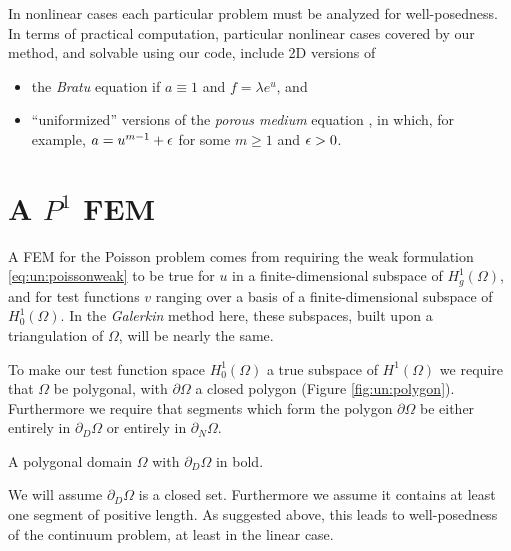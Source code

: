 In nonlinear cases each particular problem must be analyzed for well-posedness.  In terms of practical computation, particular nonlinear cases covered by our method, and solvable using our code, include 2D versions of
\begin{itemize}
\item the \emph{Bratu} equation if $a\equiv 1$ and $f=\lambda e^u$, and
\item ``uniformized'' versions of the \emph{porous medium} equation \citep{Ockendonetal2003}, in which, for example, $a=u^{m-1}+\epsilon$ for some $m\ge 1$ and $\epsilon>0$.
\end{itemize}


\section{A $P^1$ FEM}

A FEM for the Poisson problem comes from requiring the weak formulation \eqref{eq:un:poissonweak} to be true for $u$ in a finite-dimensional subspace of $H_{g}^1(\Omega)$, and for test functions $v$ ranging over a basis of a finite-dimensional subspace of $H_{0}^1(\Omega)$.  In the \emph{Galerkin} method here, these subspaces, built upon a triangulation of $\Omega$, will be nearly the same.

To make our test function space $H_{0}^1(\Omega)$ a true subspace of $H^1(\Omega)$ we require that $\Omega$ be polygonal, with $\partial\Omega$ a closed polygon (Figure \ref{fig:un:polygon}).  Furthermore we require that segments which form the polygon $\partial\Omega$ be either entirely in $\partial_D\Omega$ or entirely in $\partial_N\Omega$.

\begin{marginfigure}

\caption{A polygonal domain $\Omega$ with $\partial_D\Omega$ in bold.}
\label{fig:un:polygon}
\end{marginfigure}

We will assume $\partial_D\Omega$ is a closed set.  Furthermore we assume it contains at least one segment of positive length.  As suggested above, this leads to well-posedness of the continuum problem, at least in the linear case.

